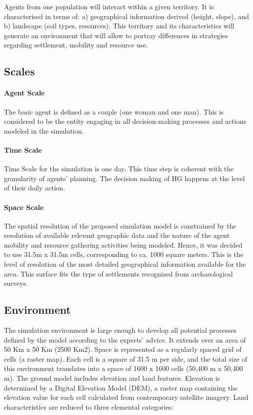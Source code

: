 \documentclass[11pt,oneside,a4paper,openright]{report}
\begin{document}
Agents from one population will interact within a given territory. It is characterised in terms of: a)
geographical information derived (height, slope), and b) landscape (soil types, resources). This
territory and its characteristics will generate an environment that will allow to portray differences in
strategies regarding settlement, mobility and resource use.


\subsection{Scales}
\paragraph{Agent Scale}
The basic agent is defined as a couple (one woman and one man). This is considered to be the entity
engaging in all decision-making processes and actions modeled in the simulation.
\paragraph{Time Scale}
Time Scale for the simulation is one day. This time step is coherent with the granularity of agents’
planning. The decision making of HG happens at the level of their daily action.

\paragraph{Space Scale}

The spatial resolution of the proposed simulation model is constrained by the resolution of available
relevant geographic data and the nature of the agent mobility and resource gathering activities being
modeled.
Hence, it was decided to use 31.5m x 31.5m cells, corresponding to ca. 1000 square meters. This is
the level of resolution of the most detailed geographical information available for the area. This surface
fits the type of settlements recognized from archaeological surveys.


\subsection{Environment}
The simulation environment is large enough to develop all potential processes defined by the model according to the
experts' advice. It extends over an area of 50 Km x 50 Km (2500 Km2). Space is represented as a regularly spaced grid
of cells (a raster map). Each cell is a square of 31.5 m per side, and the total size of this environment
translates into a space of 1600 x 1600 cells (50,400 m x 50,400 m).
The ground model includes elevation and land features. Elevation is determined by a Digital Elevation
Model (DEM), a raster map containing the elevation value for each cell calculated from contemporary
satellite imagery. Land characteristics are reduced to three elemental categories:
\end{document}
